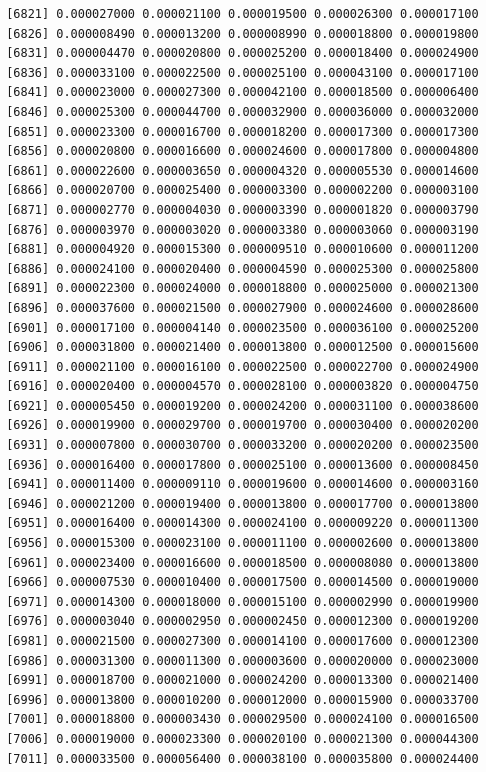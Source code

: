 \documentclass[]{article}
\begin{document}
\begin{verbatim}
 [6821] 0.000027000 0.000021100 0.000019500 0.000026300 0.000017100
 [6826] 0.000008490 0.000013200 0.000008990 0.000018800 0.000019800
 [6831] 0.000004470 0.000020800 0.000025200 0.000018400 0.000024900
 [6836] 0.000033100 0.000022500 0.000025100 0.000043100 0.000017100
 [6841] 0.000023000 0.000027300 0.000042100 0.000018500 0.000006400
 [6846] 0.000025300 0.000044700 0.000032900 0.000036000 0.000032000
 [6851] 0.000023300 0.000016700 0.000018200 0.000017300 0.000017300
 [6856] 0.000020800 0.000016600 0.000024600 0.000017800 0.000004800
 [6861] 0.000022600 0.000003650 0.000004320 0.000005530 0.000014600
 [6866] 0.000020700 0.000025400 0.000003300 0.000002200 0.000003100
 [6871] 0.000002770 0.000004030 0.000003390 0.000001820 0.000003790
 [6876] 0.000003970 0.000003020 0.000003380 0.000003060 0.000003190
 [6881] 0.000004920 0.000015300 0.000009510 0.000010600 0.000011200
 [6886] 0.000024100 0.000020400 0.000004590 0.000025300 0.000025800
 [6891] 0.000022300 0.000024000 0.000018800 0.000025000 0.000021300
 [6896] 0.000037600 0.000021500 0.000027900 0.000024600 0.000028600
 [6901] 0.000017100 0.000004140 0.000023500 0.000036100 0.000025200
 [6906] 0.000031800 0.000021400 0.000013800 0.000012500 0.000015600
 [6911] 0.000021100 0.000016100 0.000022500 0.000022700 0.000024900
 [6916] 0.000020400 0.000004570 0.000028100 0.000003820 0.000004750
 [6921] 0.000005450 0.000019200 0.000024200 0.000031100 0.000038600
 [6926] 0.000019900 0.000029700 0.000019700 0.000030400 0.000020200
 [6931] 0.000007800 0.000030700 0.000033200 0.000020200 0.000023500
 [6936] 0.000016400 0.000017800 0.000025100 0.000013600 0.000008450
 [6941] 0.000011400 0.000009110 0.000019600 0.000014600 0.000003160
 [6946] 0.000021200 0.000019400 0.000013800 0.000017700 0.000013800
 [6951] 0.000016400 0.000014300 0.000024100 0.000009220 0.000011300
 [6956] 0.000015300 0.000023100 0.000011100 0.000002600 0.000013800
 [6961] 0.000023400 0.000016600 0.000018500 0.000008080 0.000013800
 [6966] 0.000007530 0.000010400 0.000017500 0.000014500 0.000019000
 [6971] 0.000014300 0.000018000 0.000015100 0.000002990 0.000019900
 [6976] 0.000003040 0.000002950 0.000002450 0.000012300 0.000019200
 [6981] 0.000021500 0.000027300 0.000014100 0.000017600 0.000012300
 [6986] 0.000031300 0.000011300 0.000003600 0.000020000 0.000023000
 [6991] 0.000018700 0.000021000 0.000024200 0.000013300 0.000021400
 [6996] 0.000013800 0.000010200 0.000012000 0.000015900 0.000033700
 [7001] 0.000018800 0.000003430 0.000029500 0.000024100 0.000016500
 [7006] 0.000019000 0.000023300 0.000020100 0.000021300 0.000044300
 [7011] 0.000033500 0.000056400 0.000038100 0.000035800 0.000024400

\end{verbatim}
\end{document}

